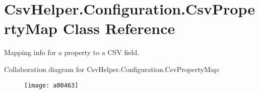 \hypertarget{a00069}{\section{Csv\-Helper.\-Configuration.\-Csv\-Property\-Map Class Reference}
\label{a00069}
}


Mapping info for a property to a C\-S\-V field.  




Collaboration diagram for Csv\-Helper.\-Configuration.\-Csv\-Property\-Map\-:
\nopagebreak
\begin{figure}[H]
\begin{center}
\leavevmode
\texttt{[image: a00463]}
\end{center}
\end{figure}
